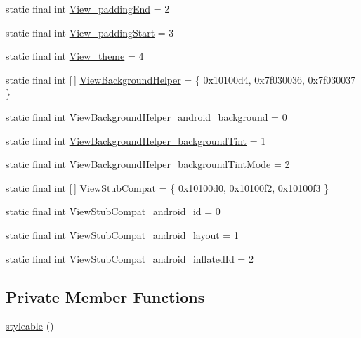 \begin{DoxyCompactItemize}
\item 
static final int \mbox{\hyperlink{classandroid_1_1support_1_1design_1_1_r_1_1styleable_a39d2f956f97b594db965bf5bf2ab140c}{View\+\_\+padding\+End}} = 2
\item 
static final int \mbox{\hyperlink{classandroid_1_1support_1_1design_1_1_r_1_1styleable_a32303521941b6c1b55688083d340802d}{View\+\_\+padding\+Start}} = 3
\item 
static final int \mbox{\hyperlink{classandroid_1_1support_1_1design_1_1_r_1_1styleable_a354c42dd69296d28a7ecf2124e7b062d}{View\+\_\+theme}} = 4
\item 
static final int \mbox{[}$\,$\mbox{]} \mbox{\hyperlink{classandroid_1_1support_1_1design_1_1_r_1_1styleable_a7df8d9542168fb1f80021c7e5b776ddb}{View\+Background\+Helper}} = \{ 0x10100d4, 0x7f030036, 0x7f030037 \}
\item 
static final int \mbox{\hyperlink{classandroid_1_1support_1_1design_1_1_r_1_1styleable_ac20c4e59460f7e880c63b69c5b38b04e}{View\+Background\+Helper\+\_\+android\+\_\+background}} = 0
\item 
static final int \mbox{\hyperlink{classandroid_1_1support_1_1design_1_1_r_1_1styleable_af1863103f3bd67eddcd4df9bc5602067}{View\+Background\+Helper\+\_\+background\+Tint}} = 1
\item 
static final int \mbox{\hyperlink{classandroid_1_1support_1_1design_1_1_r_1_1styleable_a10377d2903195cc827b6074c9a338504}{View\+Background\+Helper\+\_\+background\+Tint\+Mode}} = 2
\item 
static final int \mbox{[}$\,$\mbox{]} \mbox{\hyperlink{classandroid_1_1support_1_1design_1_1_r_1_1styleable_a9d1ab53e5b97dd9ed9bd6109532344ef}{View\+Stub\+Compat}} = \{ 0x10100d0, 0x10100f2, 0x10100f3 \}
\item 
static final int \mbox{\hyperlink{classandroid_1_1support_1_1design_1_1_r_1_1styleable_a28232eb26205dd7d1926081f2535ab1e}{View\+Stub\+Compat\+\_\+android\+\_\+id}} = 0
\item 
static final int \mbox{\hyperlink{classandroid_1_1support_1_1design_1_1_r_1_1styleable_ae3ebfa5defbb371675ed847339ac19af}{View\+Stub\+Compat\+\_\+android\+\_\+layout}} = 1
\item 
static final int \mbox{\hyperlink{classandroid_1_1support_1_1design_1_1_r_1_1styleable_a72e44c4ee2da3d0d5ad9c3780f98d454}{View\+Stub\+Compat\+\_\+android\+\_\+inflated\+Id}} = 2
\end{DoxyCompactItemize}
\subsection*{Private Member Functions}
\begin{DoxyCompactItemize}
\item 
\mbox{\hyperlink{classandroid_1_1support_1_1design_1_1_r_1_1styleable_a462dbfacb7fa5a21df9e1e562f6ac09e}{styleable}} ()
\end{DoxyCompactItemize}


